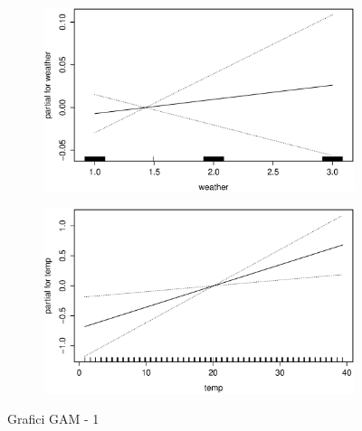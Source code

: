 \begin{figure}[H]
        \medskip
        \begin{subfigure}{0.4\textwidth}
          \includegraphics[width=\columnwidth]{images/non-linear/gam/gam-weather.eps}
        \end{subfigure}
        \hspace*{\fill}
        \begin{subfigure}{0.4\textwidth}
          \includegraphics[width=\columnwidth]{images/non-linear/gam/gam-temp.eps}
        \end{subfigure}

        \caption{Grafici GAM - 1}\label{fig:gam-1}
\end{figure}


